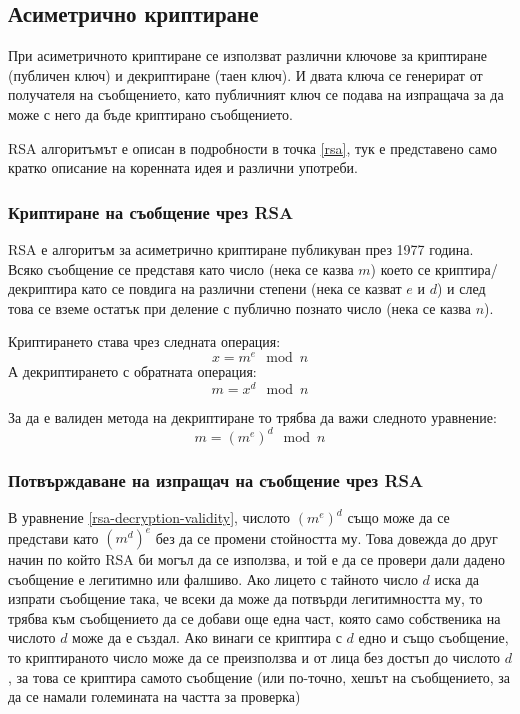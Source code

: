 
  \subsection{Асиметрично криптиране}
  При асиметричното криптиране се използват различни ключове за криптиране (публичен ключ) и декриптиране (таен ключ). И двата ключа се генерират от получателя на съобщението, като публичният ключ се подава на изпращача за да може с него да бъде криптирано съобщението.

  RSA алгоритъмът е описан в подробности в точка \ref{rsa}, тук е представено само кратко описание на коренната идея и различни употреби.

    \subsubsection{Криптиране на съобщение чрез RSA}
    RSA е алгоритъм за асиметрично криптиране публикуван през 1977 година.\cite{rsapaper} Всяко съобщение се представя като число (нека се казва $m$) което се криптира/декриптира като се повдига на различни степени (нека се казват $e$ и $d$) и след това се вземе остатък при деление с публично познато число (нека се казва $n$).

    Криптирането става чрез следната операция:
    \begin{equation}
      x = m^e \mod n
      \label{rsa-raising-to-e}
    \end{equation}
    А декриптирането с обратната операция:
    \begin{equation}
      m = x^d \mod n
      \label{rsa-raising-to-d}
    \end{equation}

    За да е валиден метода на декриптиране то трябва да важи следното уравнение:
    \begin{equation}
      m = (m^e)^d \mod n
      \label{rsa-decryption-validity}
    \end{equation}

    \subsubsection{Потвърждаване на изпращач на съобщение чрез RSA}
    В уравнение \ref{rsa-decryption-validity}, числото $(m^e)^d$ също може да се представи като $(m^d)^e$ без да се промени стойността му. Това довежда до друг начин по който RSA би могъл да се използва, и той е да се провери дали дадено съобщение е легитимно или фалшиво. Ако лицето с тайното число $d$ иска да изпрати съобщение така, че всеки да може да потвърди легитимността му, то трябва към съобщението да се добави още една част, която само собственика на числото $d$ може да е създал. Ако винаги се криптира с $d$ едно и също съобщение, то криптираното число може да се преизползва и от лица без достъп до числото $d$, за това се криптира самото съобщение (или по-точно, хешът на съобщението, за да се намали големината на частта за проверка)


